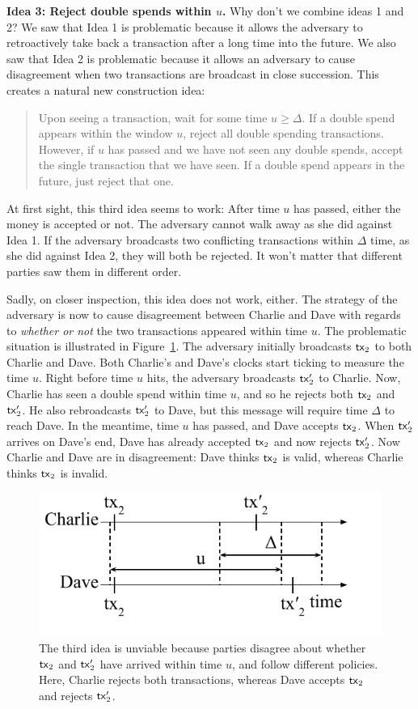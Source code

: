 \noindent
\textbf{Idea 3: Reject double spends within $u$.} Why don't we combine ideas 1 and 2? We saw that
Idea 1 is problematic because it allows the adversary to retroactively take back a transaction after
a long time into the future. We also saw that Idea 2 is problematic because it allows an adversary to
cause disagreement when two transactions are broadcast in close succession. This creates a natural
new construction idea:

\begin{quote}
Upon seeing a transaction, wait for some time $u \geq \Delta$. If a double spend
appears within the window $u$, reject all double spending transactions. However, if $u$ has passed and we have
not seen any double spends, accept the single transaction that we have seen. If a double spend appears in
the future, just reject that one.
\end{quote}

At first sight, this third idea seems to work: After time $u$ has passed, either the money is accepted or not.
The adversary cannot walk away as she did against Idea 1. If the adversary broadcasts two conflicting
transactions within $\Delta$ time, as she did against Idea 2, they will both be rejected. It won't matter
that different parties saw them in different order.

Sadly, on closer inspection, this idea does not work,
either. The strategy of the adversary is now to cause disagreement between Charlie and Dave with
regards to \emph{whether or not} the two transactions appeared within time $u$. The problematic situation
is illustrated in Figure~\ref{fig.simple-idea-3}. The adversary initially broadcasts $\mathsf{tx}_2$
to both Charlie and Dave. Both Charlie's and Dave's clocks start ticking to measure the time $u$.
Right before time $u$ hits, the adversary broadcasts $\mathsf{tx}_2'$ to Charlie. Now, Charlie has seen
a double spend within time $u$, and so he rejects both $\mathsf{tx}_2$ and $\mathsf{tx}_2'$. He also rebroadcasts
$\mathsf{tx}_2'$ to Dave, but this message will require time $\Delta$ to reach Dave. In the meantime,
time $u$ has passed, and Dave accepts $\mathsf{tx}_2$. When $\mathsf{tx}_2'$ arrives on Dave's end, Dave has
already accepted $\mathsf{tx}_2$ and now rejects $\mathsf{tx}_2'$. Now Charlie and Dave are in disagreement:
Dave thinks $\mathsf{tx}_2$ is valid, whereas Charlie thinks $\mathsf{tx}_2$ is invalid.

\begin{figure}[h]
    \centering
    \includegraphics[width=0.45 \columnwidth,keepaspectratio]{figures/simple-idea-3.pdf}
    \caption{The third idea is unviable because parties
    disagree about whether $\mathsf{tx}_2$ and $\mathsf{tx}_2'$ have arrived within time $u$,
    and follow different policies. Here, Charlie rejects both transactions, whereas
    Dave accepts $\mathsf{tx}_2$ and rejects $\mathsf{tx}_2'$.}
    \label{fig.simple-idea-3}
\end{figure}

